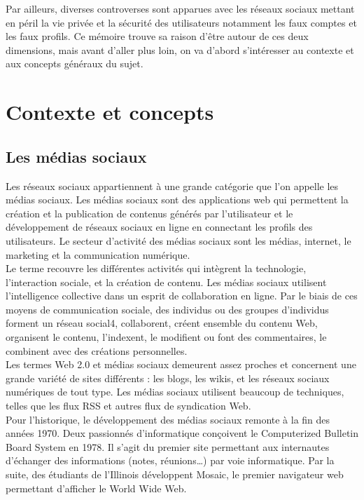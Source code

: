 \documentclass[12pt]{report}
\begin{document}
Par ailleurs, diverses controverses sont apparues avec les réseaux sociaux mettant en péril la vie privée et la sécurité des utilisateurs notamment les faux comptes et les faux profils. Ce mémoire trouve sa raison d'être autour de ces deux dimensions, mais avant d'aller plus loin, on va d'abord s'intéresser au contexte et aux concepts généraux du sujet.\\

\chapter{Contexte et concepts}
\section{Les médias sociaux}
Les réseaux sociaux appartiennent à une grande catégorie que l'on appelle les médias sociaux. Les médias sociaux sont des applications web qui permettent la création et la publication de contenus générés par l’utilisateur et le développement de réseaux sociaux en ligne en connectant les profils des utilisateurs. Le secteur d'activité des médias sociaux sont les médias, internet, le marketing et la communication numérique.\\

Le terme recouvre les différentes activités qui intègrent la technologie, l’interaction sociale, et la création de contenu. Les médias sociaux utilisent l’intelligence collective dans un esprit de collaboration en ligne. Par le biais de ces moyens de communication sociale, des individus ou des groupes d’individus forment un réseau social4, collaborent, créent ensemble du contenu Web, organisent le contenu, l’indexent, le modifient ou font des commentaires, le combinent avec des créations personnelles. \\

Les termes Web 2.0 et médias sociaux demeurent assez proches et concernent une grande variété de sites différents : les blogs, les wikis, et les réseaux sociaux numériques de tout type. Les médias sociaux utilisent beaucoup de techniques, telles que les flux RSS et autres flux de syndication Web. \\

Pour l'historique, le développement des médias sociaux remonte à la fin des années 1970. Deux passionnés d’informatique conçoivent le Computerized Bulletin Board System en 1978. Il s’agit du premier site permettant aux internautes d’échanger des informations (notes, réunions…) par voie informatique. Par la suite, des étudiants de l’Illinois développent Mosaic, le premier navigateur web permettant d’afficher le World Wide Web. \\
\end{document}
